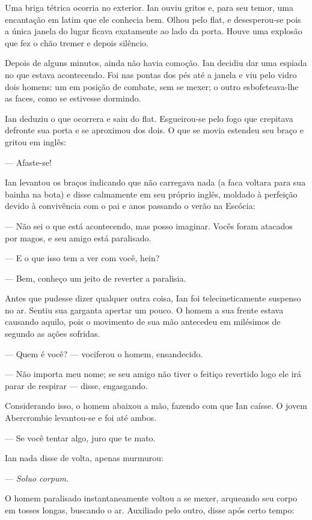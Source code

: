 Uma briga tétrica ocorria no exterior. Ian ouviu gritos e, para seu
temor, uma encantação em latim que ele conhecia bem. Olhou pelo flat, e
desesperou-se pois a única janela do lugar ficava exatamente ao lado da
porta. Houve uma explosão que fez o chão tremer e depois silêncio.

Depois de alguns minutos, ainda não havia comoção. Ian decidiu dar uma
espiada no que estava acontecendo. Foi nas pontas dos pés até a janela e
viu pelo vidro dois homens: um em posição de combate, sem se mexer; o
outro esbofeteava-lhe as faces, como se estivesse dormindo.

Ian deduziu o que ocorrera e saiu do flat. Esgueirou-se pelo fogo que
crepitava defronte sua porta e se aproximou dos dois. O que se movia
estendeu seu braço e gritou em inglês:

--- Afaste-se!

Ian levantou os braços indicando que não carregava nada (a faca voltara
para sua bainha na bota) e disse calmamente em seu próprio inglês,
moldado à perfeição devido à convivência com o pai e anos passando o
verão na Escócia:

--- Não sei o que está acontecendo, mas posso imaginar. Vocês foram
atacados por magos, e seu amigo está paralisado.

--- E o que isso tem a ver com você, hein?

--- Bem, conheço um jeito de reverter a paralisia.

Antes que pudesse dizer qualquer outra coisa, Ian foi telecineticamente
suspenso no ar. Sentiu sua garganta apertar um pouco. O homem a sua
frente estava causando aquilo, pois o movimento de sua mão antecedeu em
milésimos de segundo as ações sofridas.

--- Quem é você? --- vociferou o homem, ensandecido.

--- Não importa meu nome; se seu amigo não tiver o feitiço revertido
logo ele irá parar de respirar --- disse, engasgando.

Considerando isso, o homem abaixou a mão, fazendo com que Ian caísse. O
jovem Abercrombie levantou-se e foi até ambos.

--- Se você tentar algo, juro que te mato.

Ian nada disse de volta, apenas murmurou:

--- \textit{Soluo corpum}.

O homem paralisado instantaneamente voltou a se mexer, arqueando seu
corpo em tosses longas, buscando o ar. Auxiliado pelo outro, disse após
certo tempo:

